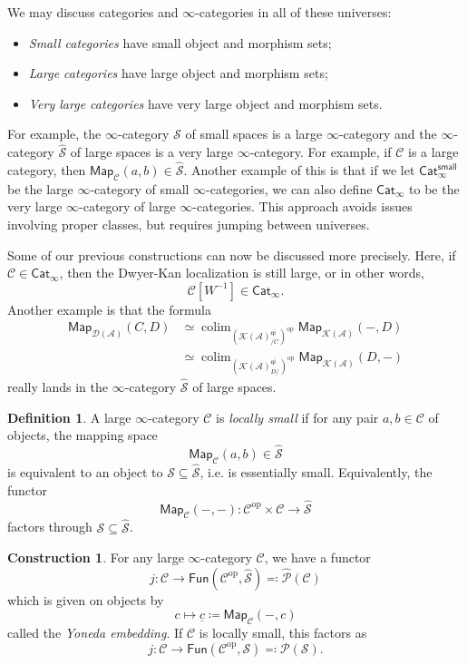 \documentclass[10pt]{amsart}
\theoremstyle{definition}
\newtheorem{defn}[thm]{Definition}
\newtheorem{con}[thm]{Construction}
\theoremstyle{remark}
\theoremstyle{plain}
\theoremstyle{definition}
\theoremstyle{remark}
\newcommand{\mc}[1]{\mathcal{#1}}
\newcommand{\ms}[1]{\mathsf{#1}}
\newcommand{\ul}[1]{\underline{#1}}
\newcommand{\1}{\mathbf{1}}
\newcommand{\2}{\mathbf{2}}
\newcommand{\3}{\mathbf{3}}
\DeclareMathOperator{\op}{op}
\DeclareMathOperator*{\colim}{colim}
\begin{document}
We may discuss categories and $\infty$-categories in all of these universes:
\begin{itemize}
    \item \textit{Small categories} have small object and morphism sets;
    \item \textit{Large categories} have large object and morphism sets;
    \item \textit{Very large categories} have very large object and morphism sets.
\end{itemize}
For example, the $\infty$-category $\mc{S}$ of small spaces is a large $\infty$-category and the $\infty$-category $\hat{\mc{S}}$ of large spaces is a very large $\infty$-category. For example, if $\mc{C}$ is a large category, then $\ms{Map}_{\mc{C}}(a,b) \in \hat{\mc{S}}$. Another example of this is that if we let $\ms{Cat}_{\infty}^{\ms{small}}$ be the large $\infty$-category of small $\infty$-categories, we can also define $\ms{Cat}_{\infty}$ to be the very large $\infty$-category of large $\infty$-categories. This approach avoids issues involving proper classes, but requires jumping between universes.

Some of our previous constructions can now be discussed more precisely. Here, if $\mc{C} \in \ms{Cat}_{\infty}$, then the Dwyer-Kan localization is still large, or in other words,
\[ \mc{C}[W^{-1}] \in \ms{Cat}_{\infty}. \]
Another example is that the formula
\begin{align*}
    \ms{Map}_{\mc{D}(\mc{A})}(C, D) &\simeq \colim_{(\mc{K}(\mc{A})_{/C}^{\ms{qi}})^{\op}} \ms{Map}_{\mc{K}(\mc{A})}(-, D) \\
    &\simeq \colim_{(\mc{K}(\mc{A})_{D/}^{\ms{qi}})^{\op}} \ms{Map}_{\mc{K}(\mc{A})}(D, -)
\end{align*}
really lands in the $\infty$-category $\hat{\mc{S}}$ of large spaces.

\begin{defn}
    A large $\infty$-category $\mc{C}$ is \textit{locally small} if for any pair $a,b \in \mc{C}$ of objects, the mapping space
    \[ \ms{Map}_{\mc{C}}(a,b) \in \hat{\mc{S}} \]
    is equivalent to an object to $\mc{S} \subseteq \hat{\mc{S}}$, i.e. is essentially small. Equivalently, the functor
    \[ \ms{Map}_{\mc{C}}(-,-) \colon \mc{C}^{\op} \times \mc{C} \to \hat{\mc{S}} \]
    factors through $\mc{S} \subseteq \hat{\mc{S}}$.
\end{defn}

\begin{con}
    For any large $\infty$-category $\mc{C}$, we have a functor
    \[ j \colon \mc{C} \to \ms{Fun}(\mc{C}^{\op}, \hat{\mc{S}}) \eqqcolon \hat{\mc{P}}(\mc{C}) \]
    which is given on objects by
    \[ c \mapsto \ul{c} \coloneqq \ms{Map}_{\mc{C}}(-, c) \]
    called the \textit{Yoneda embedding}. If $\mc{C}$ is locally small, this factors as
    \[ j \colon \mc{C} \to \ms{Fun}(\mc{C}^{\op}, \mc{S}) \eqqcolon \mc{P}(\mc{S}). \]
\end{con}
\end{document}
